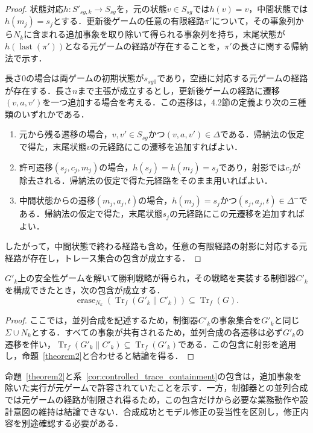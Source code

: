 \begin{proof}
状態対応$h:S'_{sg,k}\to S_{sg}$を，元の状態$v\in S_{sg}$では$h(v)=v$，中間状態では$h(m_j)=s_j$とする．更新後ゲームの任意の有限経路$\pi'$について，その事象列から$N_k$に含まれる追加事象を取り除いて得られる事象列を持ち，末尾状態が$h(\operatorname{last}(\pi'))$となる元ゲームの経路が存在することを，$\pi'$の長さに関する帰納法で示す．

長さ$0$の場合は両ゲームの初期状態が$s_{sg0}$であり，空語に対応する元ゲームの経路が存在する．長さ$n$まで主張が成立するとし，更新後ゲームの経路に遷移$(v,a,v')$を一つ追加する場合を考える．この遷移は，4.2節の定義より次の三種類のいずれかである．
\begin{enumerate}
\item 元から残る遷移の場合，$v,v'\in S_{sg}$かつ$(v,a,v')\in\Delta$である．帰納法の仮定で得た，末尾状態$v$の元経路にこの遷移を追加すればよい．
\item 許可遷移$(s_j,c_j,m_j)$の場合，$h(s_j)=h(m_j)=s_j$であり，射影では$c_j$が除去される．帰納法の仮定で得た元経路をそのまま用いればよい．
\item 中間状態からの遷移$(m_j,a_j,t)$の場合，$h(m_j)=s_j$かつ$(s_j,a_j,t)\in\Delta^{-}$である．帰納法の仮定で得た，末尾状態$s_j$の元経路にこの元遷移を追加すればよい．
\end{enumerate}
したがって，中間状態で終わる経路も含め，任意の有限経路の射影に対応する元経路が存在し，トレース集合の包含が成立する．
\end{proof}

\begin{corollary}[合成された制御器のトレース包含]
\label{cor:controlled_trace_containment}
$G'_k$上の安全性ゲームを解いて勝利戦略が得られ，その戦略を実装する制御器$C'_k$を構成できたとき，次の包含が成立する．
\[
\operatorname{erase}_{N_k}(\operatorname{Tr}_f(G'_k\parallel C'_k))
\subseteq\operatorname{Tr}_f(G).
\]
\end{corollary}

\begin{proof}
ここでは，並列合成を記述するため，制御器$C'_k$の事象集合を$G'_k$と同じ$\Sigma\cup N_k$とする．すべての事象が共有されるため，並列合成の各遷移は必ず$G'_k$の遷移を伴い，$\operatorname{Tr}_f(G'_k\parallel C'_k)\subseteq\operatorname{Tr}_f(G'_k)$である．この包含に射影を適用し，命題~\ref{theorem2}と合わせると結論を得る．
\end{proof}

命題~\ref{theorem2}と系~\ref{cor:controlled_trace_containment}の包含は，追加事象を除いた実行が元ゲームで許容されていたことを示す．一方，制御器との並列合成では元ゲームの経路が制限され得るため，この包含だけから必要な業務動作や設計意図の維持は結論できない．合成成功とモデル修正の妥当性を区別し，修正内容を別途確認する必要がある．

